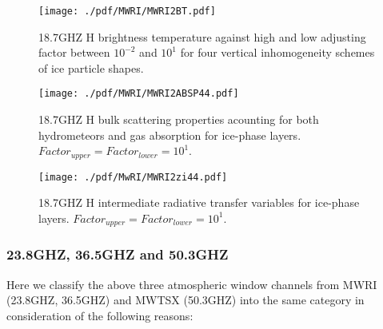 \begin{figure}[hbtp] 
\centering
\texttt{[image: ./pdf/MWRI/MWRI2BT.pdf]}
\caption{18.7GHZ H brightness temperature against high and low adjusting factor between $10^{-2}$ and $10^{1}$ for four vertical 
inhomogeneity schemes of ice particle shapes.}
\label{fig:MWRI2BT}
\end{figure}

\begin{figure}[hbtp] 
\centering
\texttt{[image: ./pdf/MWRI/MWRI2ABSP44.pdf]}
\caption{18.7GHZ H bulk scattering properties acounting for both hydrometeors and gas absorption for ice-phase layers.
$Factor_{upper} = Factor_{lower} = 10^{1}$.}
\label{fig:MWRI2ABSP44}
\end{figure}

\begin{figure}[hbtp] 
\centering
\texttt{[image: ./pdf/MwRI/MWRI2zi44.pdf]}
\label{fig:MWRI2zi44}
\caption{18.7GHZ H intermediate radiative transfer variables for ice-phase layers. $Factor_{upper} = Factor_{lower} = 10^{1}$.}
\end{figure}

\clearpage


\subsubsection{23.8GHZ, 36.5GHZ and 50.3GHZ}

Here we classify the above three atmospheric window channels from MWRI (23.8GHZ, 36.5GHZ) and MWTSX (50.3GHZ) into the same category 
in consideration of the following reasons:

